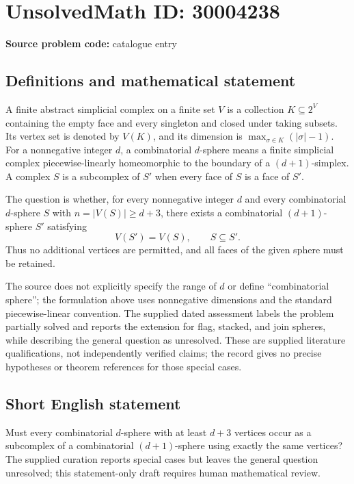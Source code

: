 \documentclass[11pt]{article}
\begin{document}
\section*{UnsolvedMath ID: 30004238}
\textbf{Source problem code:} catalogue entry
\subsection{Definitions and mathematical statement}
A finite abstract simplicial complex on a finite set \(V\) is a collection \(K\subseteq 2^V\) containing the empty face and every singleton and closed under taking subsets. Its vertex set is denoted by \(V(K)\), and its dimension is \(\max_{\sigma\in K}(|\sigma|-1)\). For a nonnegative integer \(d\), a combinatorial \(d\)-sphere means a finite simplicial complex piecewise-linearly homeomorphic to the boundary of a \((d+1)\)-simplex. A complex \(S\) is a subcomplex of \(S'\) when every face of \(S\) is a face of \(S'\).

The question is whether, for every nonnegative integer \(d\) and every combinatorial \(d\)-sphere \(S\) with \(n=|V(S)|\geq d+3\), there exists a combinatorial \((d+1)\)-sphere \(S'\) satisfying
\[
V(S')=V(S),\qquad S\subseteq S'.
\]
Thus no additional vertices are permitted, and all faces of the given sphere must be retained.

The source does not explicitly specify the range of \(d\) or define ``combinatorial sphere''; the formulation above uses nonnegative dimensions and the standard piecewise-linear convention. The supplied dated assessment labels the problem partially solved and reports the extension for flag, stacked, and join spheres, while describing the general question as unresolved. These are supplied literature qualifications, not independently verified claims; the record gives no precise hypotheses or theorem references for those special cases.
\subsection{Short English statement}
Must every combinatorial \(d\)-sphere with at least \(d+3\) vertices occur as a subcomplex of a combinatorial \((d+1)\)-sphere using exactly the same vertices? The supplied curation reports special cases but leaves the general question unresolved; this statement-only draft requires human mathematical review.
\end{document}
